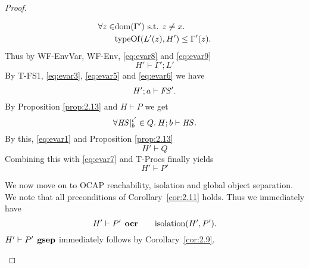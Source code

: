 \begin{proof}
\begin{description}
\begin{description}
\begin{description}
\begin{equation}
\begin{aligned}
                  \forall z \in &\mbox{$\mathrm{dom}$}(\Gamma') \text{ s.t. } z \neq x. \\
                  & \mbox{$\mathrm{typeOf}$}(L'(z), H') \leq \Gamma'(z).
                \end{aligned}
              \end{equation}
              Thus by {\sc WF-EnvVar}, {\sc WF-Env}, \eqref{eq:evar8} and
              \eqref{eq:evar9} 
              \begin{equation} \label{eq:evar6}
                H' \vdash \Gamma'; L'
              \end{equation}
              By {\sc T-FS1}, \eqref{eq:evar3}, \eqref{eq:evar5} and
              \eqref{eq:evar6} we have
              \begin{equation} \label{eq:evar7}
                H'; a \vdash \mathit{FS}'.
              \end{equation}
              By Proposition \ref{prop:2.13} and $H \vdash P$ we get
              \begin{equation*} 
                \forall \mathit{HS}|_b^{\iota'} \in Q. \: H; b \vdash \mathit{HS}.
              \end{equation*}
              By this, \eqref{eq:evar1} and Proposition \ref{prop:2.13}
              \begin{equation*}
                H' \vdash Q
              \end{equation*}
              Combining this with \eqref{eq:evar7} and {\sc T-Procs} finally
              yields
              \begin{equation*}
                H' \vdash P'
              \end{equation*}

              We now move on to OCAP reachability, isolation and global object
              separation. We note that all preconditions of
              Corollary~\ref{cor:2.11} holds. Thus we immediately have 
              \begin{equation*}
                H' \vdash P' \:\: \mbox{\bf ocr} \quad\quad \mbox{$\mathrm{isolation}$}(H', P').
              \end{equation*}
              $H' \vdash P' \:\: \mbox{\bf gsep}$ immediately follows by
              Corollary~\ref{cor:2.9}.


\end{description}
\end{description}
\end{description}
\end{proof}
